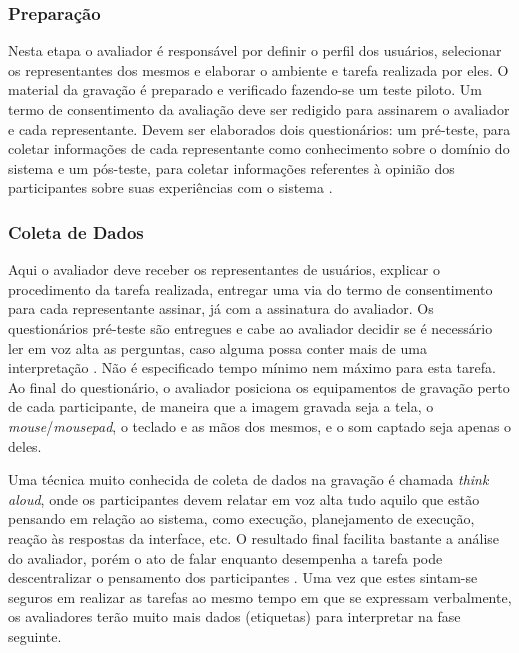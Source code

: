 \subsubsection{Preparação}

\indent Nesta etapa o avaliador é responsável por definir o perfil dos usuários, selecionar os representantes dos mesmos e elaborar o ambiente e tarefa realizada por eles. O material da gravação é preparado e verificado fazendo-se um teste piloto. Um termo de consentimento da avaliação deve ser redigido para assinarem o avaliador e cada representante. \cite[p. 305]{IHCbook} Devem ser elaborados dois questionários: um pré-teste, para coletar informações de cada representante como conhecimento sobre o domínio do sistema e um pós-teste, para coletar informações referentes à opinião dos participantes sobre suas experiências com o sistema \cite[p. 306]{IHCbook}.

\subsubsection{Coleta de Dados}

\indent Aqui o avaliador deve receber os representantes de usuários, explicar o procedimento da tarefa realizada, entregar uma via do termo de consentimento para cada representante assinar, já com a assinatura do avaliador. Os questionários pré-teste são entregues e cabe ao avaliador decidir se é necessário ler em voz alta as perguntas, caso alguma possa conter mais de uma interpretação \cite[p. 309]{IHCbook}. Não é especificado tempo mínimo nem máximo para esta tarefa. Ao final do questionário, o avaliador posiciona os equipamentos de gravação perto de cada participante, de maneira que a imagem gravada seja a tela, o \textit{mouse}/\textit{mousepad}, o teclado e as mãos dos mesmos, e o som captado seja apenas o deles. 

\indent Uma técnica muito conhecida de coleta de dados na gravação é chamada \textit{think aloud}, onde os participantes devem relatar em voz alta tudo aquilo que estão pensando em relação ao sistema, como execução, planejamento de execução, reação às respostas da interface, etc. O resultado final facilita bastante a análise do avaliador, porém o ato de falar enquanto desempenha a tarefa pode descentralizar o pensamento dos participantes \cite[p. 309]{IHCbook}. Uma vez que estes sintam-se seguros em realizar as tarefas ao mesmo tempo em que se expressam verbalmente, os avaliadores terão muito mais dados (etiquetas) para interpretar na fase seguinte.

